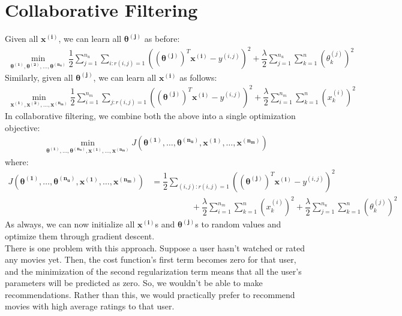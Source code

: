 \documentclass[a4paper, 12pt]{report}
\begin{document}
\section{Collaborative Filtering}
Given all $\bm{x^{\left(i\right)}}$, we can learn all $\bm{\theta^{\left(j\right)}}$ as before:
\begin{align*}
\min_{\bm{\theta^{\left(1\right)}}, \bm{\theta^{\left(2\right)}}, \dots, \bm{\theta^{\left(n_u\right)}}}\dfrac{1}{2}\sum_{j=1}^{n_u}\sum_{i:r(i,j)=1}\left(\left(\bm{\theta^{\left(j\right)}}\right)^T\bm{x^{\left(i\right)}} - y^{\left(i,j\right)}\right)^2 + \dfrac{\lambda}{2}\sum_{j=1}^{n_u}\sum_{k=1}^{n}\left(\theta_k^{(j)}\right)^2
\end{align*}
Similarly, given all $\bm{\theta^{\left(j\right)}}$, we can learn all $\bm{x^{\left(i\right)}}$ as follows:
\begin{align*}
\min_{\bm{x^{\left(1\right)}}, \bm{x^{\left(2\right)}}, \dots, \bm{x^{\left(n_m\right)}}}\dfrac{1}{2}\sum_{i=1}^{n_m}\sum_{j:r(i,j)=1}\left(\left(\bm{\theta^{\left(j\right)}}\right)^T\bm{x^{\left(i\right)}} - y^{\left(i,j\right)}\right)^2 + \dfrac{\lambda}{2}\sum_{i=1}^{n_m}\sum_{k=1}^{n}\left(x_k^{(i)}\right)^2
\end{align*}
In collaborative filtering, we combine both the above into a single optimization objective:
\begin{align*}
\min_{\bm{\theta^{\left(1\right)}}, \dots, \bm{\theta^{\left(n_u\right)}}, \bm{x^{\left(1\right)}}, \dots, \bm{x^{\left(n_m\right)}}} J\left(\bm{\theta^{\left(1\right)}}, \dots, \bm{\theta^{\left(n_u\right)}}, \bm{x^{\left(1\right)}}, \dots, \bm{x^{\left(n_m\right)}}\right)
\end{align*}
where:
\begin{align*}
J\left(\bm{\theta^{\left(1\right)}}, \dots, \bm{\theta^{\left(n_u\right)}}, \bm{x^{\left(1\right)}}, \dots, \bm{x^{\left(n_m\right)}}\right) &= \dfrac{1}{2}\sum_{(i,j):r(i,j)=1}\left(\left(\bm{\theta^{\left(j\right)}}\right)^T\bm{x^{\left(i\right)}} - y^{\left(i,j\right)}\right)^2 \\
& \hspace{2cm} + \dfrac{\lambda}{2}\sum_{i=1}^{n_m}\sum_{k=1}^{n}\left(x_k^{(i)}\right)^2 + \dfrac{\lambda}{2}\sum_{j=1}^{n_u}\sum_{k=1}^{n}\left(\theta_k^{(j)}\right)^2
\end{align*}
As always, we can now initialize all $\bm{x^{(i)}}$s and $\bm{\theta^{(j)}}$s to random values and optimize them through gradient descent.\\
\break
There is one problem with this approach. Suppose a user hasn't watched or rated any movies yet. Then, the cost function's first term becomes zero for that user, and the minimization of the second regularization term means that all the user's parameters will be predicted as zero. So, we wouldn't be able to make recommendations. Rather than this, we would practically prefer to recommend movies with high average ratings to that user. \\
\end{document}
